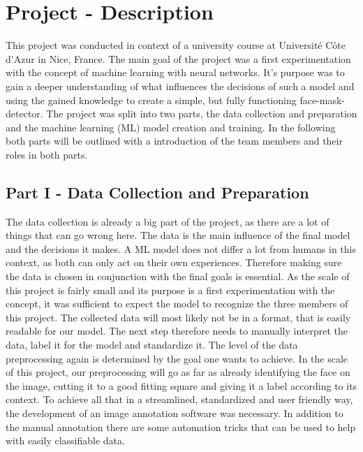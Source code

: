 
\section{Project - Description}

This project was conducted in context of a university course at Université Côte
d'Azur in Nice, France. The main goal of the project was a first experimentation
with the concept of machine learning with neural networks. It's purpose was to
gain a deeper understanding of what influences the decisions of such a model and
using the gained knowledge to create a simple, but fully functioning
face-mask-detector.
\newline
The project was split into two parts, the data collection and preparation and
the machine learning (ML) model creation and training. In the following both
parts will be outlined with a introduction of the team members and their roles
in both parts.

\subsection{Part I - Data Collection and Preparation}

The data collection is already a big part of the project, as there are a lot of
things that can go wrong here. The data is the main influence of the
final model and the decisions it makes. A ML model does not differ a lot from humans
in this context, as both can only act on their own experiences. Therefore
making sure the data is chosen in conjunction with the final goals is essential.
As the scale of this project is fairly small and its purpose is a first
experimentation with the concept, it was sufficient to expect the model to
recognize the three members of this project.
\newline
The collected data will most likely not be in a format, that is easily readable
for our model. The next step therefore needs to manually interpret the data,
label it for the model and standardize it. The level of the data preprocessing
again is determined by the goal one wants to achieve. In the scale of this
project, our preprocessing will go as far as already identifying the face on the
image, cutting it to a good fitting square and giving it a label according to
its context.
\newline
To achieve all that in a streamlined, standardized and user friendly way, the
development of an image annotation software was necessary. In addition to the
manual annotation there are some automation tricks that can be used to help with
easily classifiable data. 

